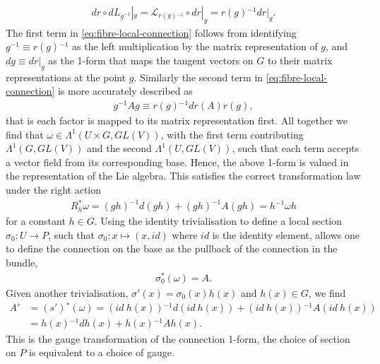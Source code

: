 \documentclass[10pt]{report}
\theoremstyle{definition}
\begin{document}
\begin{align*}
    dr \circ dL_{g^{-1}}|_g = \mathcal{L}_{r(g){}^{-1}} \circ dr |_g = r(g){}^{-1} dr |_g.
\end{align*}
The first term in \cref{eq:fibre-local-connection} follows from identifying $g^{-1}\equiv r(g){}^{-1}$ as the left multiplication by the matrix representation of $g$, and $dg \equiv dr|_g$ as the 1-form that maps the tangent vectors on $G$ to their matrix representations at the point $g$. Similarly the second term in \cref{eq:fibre-local-connection} is more accurately described as
\begin{align*}
    g^{-1} A g \equiv r(g){}^{-1} dr(A) r(g),
\end{align*}
that is each factor is mapped to its matrix representation first. All together we find that $\omega \in \Lambda^1(U \times G,GL(V))$, with the first term contributing $\Lambda^1(G,GL(V))$ and the second $\Lambda^1(U,GL(V))$, such that each term accepts a vector field from its corresponding base. Hence, the above 1-form is valued in the representation of the Lie algebra. This satisfies the correct transformation law under the right action 
\begin{align}
    R^*_h \omega = {(g h)}^{-1} d(g h) + {(gh)}^{-1} A (gh) = h^{-1} \omega h
\end{align}
for a constant $h \in G$. Using the identity trivialisation to define a local section $\sigma_0 : U \rightarrow P$, such that $\sigma_0 : x \mapsto (x,id)$ where $id$ is the identity element, allows one to define the connection on the base as the pullback of the connection in the bundle,
\begin{align}
    \sigma_0^*(\omega) = A.
\end{align}
Given another trivialisation, $\sigma'(x) = \sigma_0(x) h(x)$ and $h(x) \in G$, we find 
\begin{align}
    A' & = (s'){}^*(\omega) = (id\ h(x)){}^{-1} d(id\ h(x)) + (id\ h(x)){}^{-1} A (id\ h(x)) \\ & = h(x){}^{-1} dh(x) + h(x){}^{-1} A h(x).
\end{align}
This is the gauge transformation of the connection 1-form, the choice of section on $P$ is equivalent to a choice of gauge.
\end{document}
